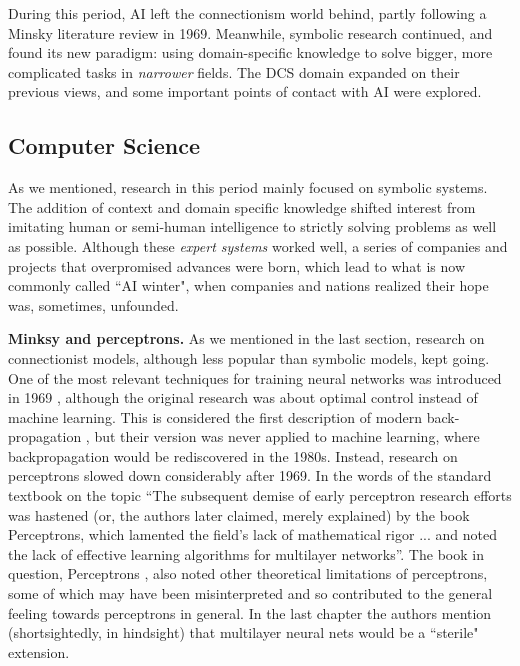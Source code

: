 \documentclass[../main.tex]{subfiles}
\begin{document}
During this period, AI left the connectionism world behind, partly following a Minsky literature review in 1969. Meanwhile, symbolic research continued, and found its new paradigm: using domain-specific knowledge to solve bigger, more complicated tasks in \textit{narrower} fields. The DCS domain expanded on their previous views, and some important points of contact with AI were explored.

\subsection{Computer Science}
As we mentioned, research in this period mainly focused on symbolic systems. The addition of context and domain specific knowledge shifted interest from imitating human or semi-human intelligence to strictly solving problems as well as possible. Although these \textit{expert systems} worked well, a series of companies and projects that overpromised advances were born, which lead to what is now commonly called ``AI winter", when companies and nations realized their hope was, sometimes, unfounded.

\vspace{4pt}
\textbf{Minksy and perceptrons.}
As we mentioned in the last section, research on connectionist models, although less popular than symbolic models, kept going. One of the most relevant techniques for training neural networks was introduced in 1969 \parencite{brysonAppliedOptimalControl1969}, although the original research was about optimal control instead of machine learning. This is considered the first description of modern back-propagation \parencite{lecunTheoreticalFrameworkBackpropagation1988}, but their version was never applied to machine learning, where backpropagation would be rediscovered in the 1980s.
Instead, research on perceptrons slowed down considerably after 1969. In the words of the standard textbook on the topic \enquote{The subsequent demise of early perceptron research efforts was hastened (or, the authors later claimed, merely explained) by the book Perceptrons, which lamented the field's lack of mathematical rigor ... and noted the lack of effective learning algorithms for multilayer networks}. The book in question, Perceptrons \parencite{minskyPerceptronIntroductionComputational1969}, also noted other theoretical limitations of perceptrons, some of which may have been misinterpreted and so contributed to the general feeling towards perceptrons in general. In the last chapter the authors mention (shortsightedly, in hindsight) that multilayer neural nets would be a ``sterile" extension.
\end{document}

